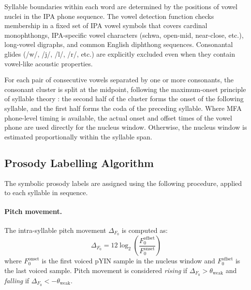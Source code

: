 Syllable boundaries within each word are determined by the positions of vowel
nuclei in the IPA phone sequence. The vowel detection function checks membership
in a fixed set of IPA vowel symbols that covers cardinal monophthongs,
IPA-specific vowel characters (schwa, open-mid, near-close, etc.), long-vowel
digraphs, and common English diphthong sequences. Consonantal glides (/w/, /j/,
/l/, /r/, etc.) are explicitly excluded even when they contain vowel-like
acoustic properties.

For each pair of consecutive vowels separated by one or more consonants, the
consonant cluster is split at the midpoint, following the maximum-onset principle
of syllable theory \cite{kahn1976syllable}: the second half of the cluster forms
the onset of the following syllable, and the first half forms the coda of the
preceding syllable. Where MFA phone-level timing is available, the actual onset
and offset times of the vowel phone are used directly for the nucleus window.
Otherwise, the nucleus window is estimated proportionally within the syllable
span.

\subsection{Prosody Labelling Algorithm}
\label{sec:prosody_label_method}

The symbolic prosody labels are assigned using the following procedure, applied
to each syllable in sequence.

\paragraph{Pitch movement.}
The intra-syllable pitch movement $\Delta_{F_0}$ is computed as:
\begin{equation}
  \Delta_{F_0} = 12 \log_2\!\left(\frac{F_0^{\mathrm{offset}}}{F_0^{\mathrm{onset}}}\right)
\end{equation}
where $F_0^{\mathrm{onset}}$ is the first voiced pYIN sample in the nucleus
window and $F_0^{\mathrm{offset}}$ is the last voiced sample. Pitch movement is
considered \emph{rising} if $\Delta_{F_0} > \theta_{\mathrm{weak}}$ and
\emph{falling} if $\Delta_{F_0} < -\theta_{\mathrm{weak}}$.


